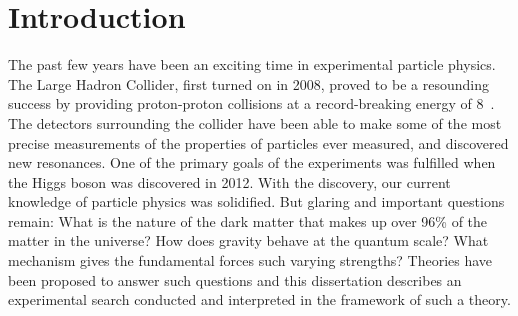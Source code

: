\clearpage
\section{Introduction\label{sec:intro}}

The past few years have been an exciting time in experimental
particle physics. The Large Hadron Collider, first turned on in 2008,
proved to be a resounding success by providing proton-proton collisions
at a record-breaking energy of 8~\TeV. The detectors surrounding the
collider have been able to make some of the most precise measurements
of the properties of particles ever measured, and discovered new resonances. 
One of the primary goals of the experiments was fulfilled when the Higgs 
boson was discovered in 2012. With the discovery, our current knowledge of particle physics was solidified.  
But glaring and important questions remain: What is the nature of the
dark matter that makes up over 96\% of the matter in the universe?
How does gravity behave at the quantum scale? What mechanism gives the
fundamental forces such varying strengths? Theories have been proposed
to answer such questions and this dissertation describes an experimental
search conducted and interpreted in the framework of such a theory.
